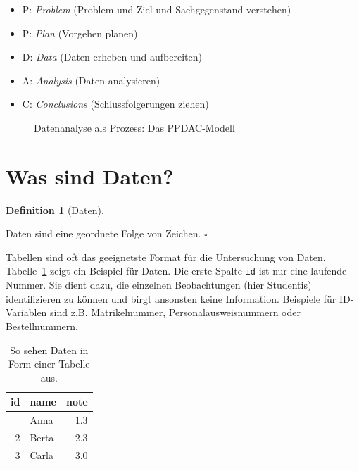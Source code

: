 \documentclass[
  letterpaper,
  twoside,
  open=any]{scrbook}
\providecommand{\tightlist}{%
  \setlength{\itemsep}{0pt}\setlength{\parskip}{0pt}}\usepackage{longtable,booktabs,array}
\theoremstyle{definition}
\theoremstyle{definition}
\theoremstyle{definition}
\newtheorem{definition}{Definition}[chapter]
\theoremstyle{remark}
\begin{document}
\begin{itemize}
\tightlist
\item
  P: \emph{Problem} (Problem und Ziel und Sachgegenstand verstehen)
\item
  P: \emph{Plan} (Vorgehen planen)
\item
  D: \emph{Data} (Daten erheben und aufbereiten)
\item
  A: \emph{Analysis} (Daten analysieren)
\item
  C: \emph{Conclusions} (Schlussfolgerungen ziehen)
\end{itemize}

\begin{figure}


\caption{\label{fig-ppdac}Datenanalyse als Prozess: Das PPDAC-Modell}

\end{figure}%

\section{Was sind Daten?}\label{was-sind-daten}

\begin{definition}[Daten]\protect\hypertarget{def-daten}{}\label{def-daten}

Daten sind eine geordnete Folge von Zeichen. \(\square\)

\end{definition}

Tabellen sind oft das geeignetste Format für die Untersuchung von Daten.
Tabelle~\ref{tbl-daten} zeigt ein Beispiel für Daten. Die erste Spalte
\texttt{id} ist nur eine laufende Nummer. Sie dient dazu, die einzelnen
Beobachtungen (hier Studentis) identifizieren zu können und birgt
ansonsten keine Information. Beispiele für ID-Variablen sind z.B.
Matrikelnummer, Personalausweisnummern oder Bestellnummern.

\begin{longtable}[]{@{}rlr@{}}

\caption{\label{tbl-daten}So sehen Daten in Form einer Tabelle aus.}

\tabularnewline

\toprule\noalign{}
id & name & note \\
\midrule\noalign{}
\endhead
\bottomrule\noalign{}
\endlastfoot
1 & Anna & 1.3 \\
2 & Berta & 2.3 \\
3 & Carla & 3.0 \\

\end{longtable}
\end{document}

